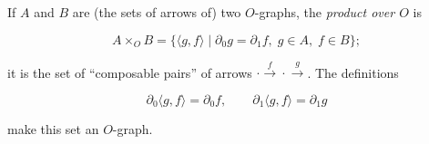 If $A$ and $B$ are (the sets of arrows of) two $O$-graphs, the \emph{product over $O$} is

\[
A \times_O B = \{ \langle g, f \rangle \mid \partial_0 g = \partial_1 f,\; g \in A,\; f \in B \};
\]

it is the set of ``composable pairs'' of arrows $\cdot \xrightarrow{f} \cdot \xrightarrow{g}$. The definitions

\[
\partial_0 \langle g, f \rangle = \partial_0 f, \qquad \partial_1 \langle g, f \rangle = \partial_1 g
\]

make this set an $O$-graph.
